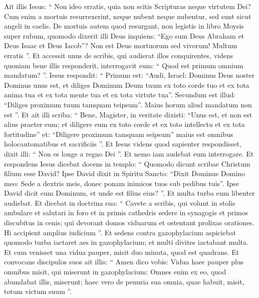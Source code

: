 \begin{biblechapter}
\begin{biblechapter}
\begin{biblechapter}
\begin{biblechapter}
\begin{biblechapter}
\begin{biblechapter}
\begin{biblechapter}
\begin{biblechapter}
\begin{biblechapter}
\begin{biblechapter}
\begin{biblechapter}
\begin{biblechapter}
\verse Ait illis Iesus: “ Non ideo erratis, quia non scitis Scripturas neque virtutem Dei? 
\verse Cum enim a mortuis resurrexerint, neque nubent neque nubentur, sed sunt sicut angeli in caelis. 
\verse De mortuis autem quod resurgant, non legistis in libro Moysis super rubum, quomodo dixerit illi Deus inquiens: “Ego sum Deus Abraham et Deus Isaac et Deus Iacob”? 
\verse Non est Deus mortuorum sed vivorum! Multum erratis ”.
 \verse Et accessit unus de scribis, qui audierat illos conquirentes, videns quoniam bene illis responderit, interrogavit eum: “ Quod est primum omnium mandatum? ”. 
 \verse Iesus respondit: “ Primum est: “Audi, Israel: Dominus Deus noster Dominus unus est, 
\verse et diliges Dominum Deum tuum ex toto corde tuo et ex tota anima tua et ex tota mente tua et ex tota virtute tua”. 
\verse Secundum est illud: “Diliges proximum tuum tamquam teipsum”. Maius horum aliud mandatum non est ”. 
 \verse Et ait illi scriba: “ Bene, Magister, in veritate dixisti: “Unus est, et non est alius praeter eum; 
\verse et diligere eum ex toto corde et ex toto intellectu et ex tota fortitudine” et: “Diligere proximum tamquam seipsum” maius est omnibus holocautomatibus et sacrificiis ”. 
\verse Et Iesus videns quod sapienter respondisset, dixit illi: “ Non es longe a regno Dei ”. Et nemo iam audebat eum interrogare.
 \verse Et respondens Iesus dicebat docens in templo: “ Quomodo dicunt scribae Christum filium esse David? 
\verse Ipse David dixit in Spiritu Sancto:
 “Dixit Dominus Domino meo: Sede a dextris meis,
 donec ponam inimicos tuos sub pedibus tuis”.
 \verse Ipse David dicit eum Dominum, et unde est filius eius? ”. Et multa turba eum libenter audiebat.
 \verse Et dicebat in doctrina sua: “ Cavete a scribis, qui volunt in stolis ambulare et salutari in foro 
\verse et in primis cathedris sedere in synagogis et primos discubitus in cenis; 
\verse qui devorant domos viduarum et ostentant prolixas orationes. Hi accipient amplius iudicium ”.
 \verse Et sedens contra gazophylacium aspiciebat quomodo turba iactaret aes in gazophylacium; et multi divites iactabant multa. 
\verse Et cum venisset una vidua pauper, misit duo minuta, quod est quadrans. 
\verse Et convocans discipulos suos ait illis: “ Amen dico vobis: Vidua haec pauper plus omnibus misit, qui miserunt in gazophylacium: 
\verse Omnes enim ex eo, quod abundabat illis, miserunt; haec vero de penuria sua omnia, quae habuit, misit, totum victum suum ”.
 

\end{biblechapter}
\end{biblechapter}
\end{biblechapter}
\end{biblechapter}
\end{biblechapter}
\end{biblechapter}
\end{biblechapter}
\end{biblechapter}
\end{biblechapter}
\end{biblechapter}
\end{biblechapter}
\end{biblechapter}
